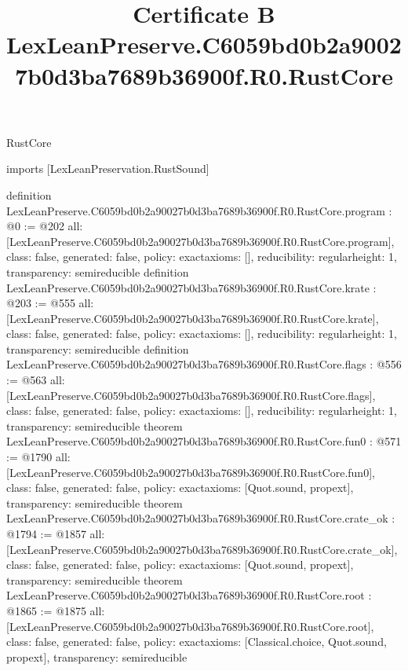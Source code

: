 \begin{lexlean}{RustCore}
\title{Certificate B LexLeanPreserve.C6059bd0b2a90027b0d3ba7689b36900f.R0.RustCore}
\begin{coremodule}
imports [LexLeanPreservation.RustSound]

definition LexLeanPreserve.C6059bd0b2a90027b0d3ba7689b36900f.R0.RustCore.program : @0 := @202 {
  all: [LexLeanPreserve.C6059bd0b2a90027b0d3ba7689b36900f.R0.RustCore.program],
  class: false,
  generated: false,
  policy: exact{axioms: []},
  reducibility: regular{height: 1},
  transparency: semireducible
}
definition LexLeanPreserve.C6059bd0b2a90027b0d3ba7689b36900f.R0.RustCore.krate : @203 := @555 {
  all: [LexLeanPreserve.C6059bd0b2a90027b0d3ba7689b36900f.R0.RustCore.krate],
  class: false,
  generated: false,
  policy: exact{axioms: []},
  reducibility: regular{height: 1},
  transparency: semireducible
}
definition LexLeanPreserve.C6059bd0b2a90027b0d3ba7689b36900f.R0.RustCore.flags : @556 := @563 {
  all: [LexLeanPreserve.C6059bd0b2a90027b0d3ba7689b36900f.R0.RustCore.flags],
  class: false,
  generated: false,
  policy: exact{axioms: []},
  reducibility: regular{height: 1},
  transparency: semireducible
}
theorem LexLeanPreserve.C6059bd0b2a90027b0d3ba7689b36900f.R0.RustCore.fun0 : @571 := @1790 {
  all: [LexLeanPreserve.C6059bd0b2a90027b0d3ba7689b36900f.R0.RustCore.fun0],
  class: false,
  generated: false,
  policy: exact{axioms: [Quot.sound, propext]},
  transparency: semireducible
}
theorem LexLeanPreserve.C6059bd0b2a90027b0d3ba7689b36900f.R0.RustCore.crate_ok : @1794 := @1857 {
  all: [LexLeanPreserve.C6059bd0b2a90027b0d3ba7689b36900f.R0.RustCore.crate_ok],
  class: false,
  generated: false,
  policy: exact{axioms: [Quot.sound, propext]},
  transparency: semireducible
}
theorem LexLeanPreserve.C6059bd0b2a90027b0d3ba7689b36900f.R0.RustCore.root : @1865 := @1875 {
  all: [LexLeanPreserve.C6059bd0b2a90027b0d3ba7689b36900f.R0.RustCore.root],
  class: false,
  generated: false,
  policy: exact{axioms: [Classical.choice, Quot.sound, propext]},
  transparency: semireducible
}


\end{coremodule}
\end{lexlean}
